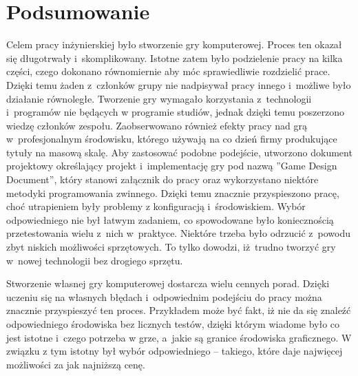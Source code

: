 \chapter{Podsumowanie}

Celem pracy inżynierskiej było stworzenie gry komputerowej. Proces ten okazał się długotrwały i~skomplikowany. Istotne zatem było podzielenie pracy na kilka części, czego dokonano równomiernie aby móc sprawiedliwie rozdzielić prace. Dzięki temu żaden z~członków grupy nie nadpisywał pracy innego i~możliwe było działanie równoległe. Tworzenie gry wymagało korzystania z~technologii i~programów nie będących w programie studiów, jednak dzięki temu poszerzono wiedzę członków zespołu. Zaobserwowano również efekty pracy nad grą w~profesjonalnym środowisku, którego używają na co dzień firmy produkujące tytuły na masową skalę. Aby zastosować podobne podejście, utworzono dokument projektowy określający projekt i~implementację gry pod nazwą ''Game Design Document'', który stanowi załącznik do pracy oraz wykorzystano niektóre metodyki programowania zwinnego. Dzięki temu znacznie przyspieszono pracę, choć utrapieniem były problemy z konfiguracją i~środowiskiem. Wybór odpowiedniego nie był łatwym zadaniem, co spowodowane było koniecznością przetestowania wielu z~nich w~praktyce. Niektóre trzeba było odrzucić z~powodu zbyt niskich możliwości sprzętowych. To tylko dowodzi, iż~trudno tworzyć gry w~nowej technologii bez drogiego sprzętu.

Stworzenie własnej gry komputerowej dostarcza wielu cennych porad. Dzięki uczeniu się na własnych błędach i~odpowiednim podejściu do pracy można znacznie przyspieszyć ten proces. Przykładem może być fakt, iż nie da się znaleźć odpowiedniego środowiska bez licznych testów, dzięki którym wiadome było co jest istotne i~czego potrzeba w grze, a~jakie są granice środowiska graficznego. W związku z tym istotny był wybór odpowiedniego -- takiego, które daje najwięcej możliwości za jak najniższą cenę.